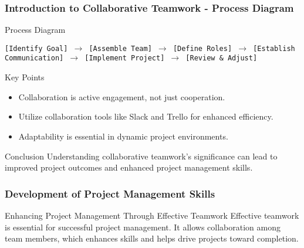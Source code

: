 \documentclass[aspectratio=169]{beamer}
\begin{document}
\begin{frame}[fragile]
    \frametitle{Introduction to Collaborative Teamwork - Process Diagram}
    
    \begin{block}{Process Diagram}
        \begin{center}
            \texttt{[Identify Goal] $\rightarrow$ [Assemble Team] $\rightarrow$ [Define Roles] $\rightarrow$ [Establish Communication] $\rightarrow$ [Implement Project] $\rightarrow$ [Review \& Adjust]}
        \end{center}
    \end{block}
    
    \begin{block}{Key Points}
        \begin{itemize}
            \item Collaboration is active engagement, not just cooperation.
            \item Utilize collaboration tools like Slack and Trello for enhanced efficiency.
            \item Adaptability is essential in dynamic project environments.
        \end{itemize}
    \end{block}
    
    \begin{block}{Conclusion}
        Understanding collaborative teamwork's significance can lead to improved project outcomes and enhanced project management skills.
    \end{block}
\end{frame}

\begin{frame}[fragile]
    \frametitle{Development of Project Management Skills}
    \begin{block}{Enhancing Project Management Through Effective Teamwork}
        Effective teamwork is essential for successful project management. It allows collaboration among team members, which enhances skills and helps drive projects toward completion.
    \end{block}
\end{frame}
\end{document}
